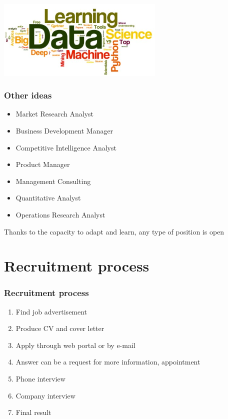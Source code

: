 \documentclass[]{beamer}
\begin{document}
\begin{frame}
\centering
\includegraphics[width=0.6\textwidth]{datascience}
\end{frame}

\begin{frame}
\frametitle{Other ideas}
\begin{itemize}
\item Market Research Analyst
\item Business Development Manager
\item Competitive Intelligence Analyst
\item Product Manager
\item Management Consulting
\item Quantitative Analyst
\item Operations Research Analyst
\end{itemize}
\end{frame}

\begin{frame}
\centering
Thanks to the capacity to adapt and learn, any type of position is open
\end{frame}

\section{Recruitment process}
\begin{frame}
\frametitle{Recruitment process}
\begin{enumerate}
\item Find job advertisement
\item Produce CV and cover letter
\item Apply through web portal or by e-mail
\item Answer can be a request for more information, appointment
\item Phone interview
\item Company interview
\item Final result
\end{enumerate}
\end{frame}
\end{document}
